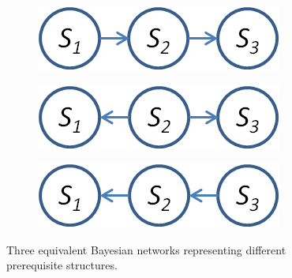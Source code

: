 \documentclass{edm_template}
\begin{document}
	\begin{figure}[!ht]\small
		\centering
		\begin{subfigure}[t]{0.32\linewidth}
			\centering
			\includegraphics[width=0.9\linewidth]{figures/s1s2s3.png}
			\caption{\label{fig:equivnet1}}
		\end{subfigure}
		\begin{subfigure}[t]{0.32\linewidth}
			\centering
			\includegraphics[width=0.9\linewidth]{figures/s2s1s3.png}
			\caption{\label{fig:equivnet2}}
		\end{subfigure}
		\begin{subfigure}[t]{0.32\linewidth}
			\centering
			\includegraphics[width=0.9\linewidth]{figures/s3s2s1.png}
			\caption{\label{fig:equivnet3}}			
		\end{subfigure}		
		\caption{Three equivalent Bayesian networks representing different prerequisite structures.\label{fig:equivnets} }
	\end{figure}
	
\end{document}
